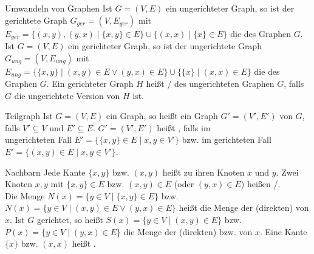 \begin{Def}{Umwandeln von Graphen}
    Ist $G = (V, E)$ ein ungerichteter Graph, so ist der gerichtete
    Graph $G_{ger} = (V, E_{ger})$ mit
    $E_{ger} = \big\{(x, y), (y, x) \;|\; \{x, y\} \in E\big\} \cup
    \big\{(x, x) \;|\; \{x\} \in E\big\}$
    die  des Graphen $G$. \\
    Ist $G = (V, E)$ ein gerichteter Graph, so ist der ungerichtete
    Graph $G_{ung} = (V, E_{ung})$ mit
    $E_{ung} = \big\{\{x, y\} \;|\; (x, y) \in E \lor (y, x) \in E\big\} \cup
    \big\{\{x\} \;|\; (x, x) \in E\big\}$
    die  des Graphen $G$. \qquad
    Ein gerichteter Graph $H$ heißt
    / des ungerichteten Graphen $G$,
    falls $G$ die ungerichtete Version von $H$ ist.
\end{Def}

\begin{Def}{Teilgraph}
    Ist $G = (V, E)$ ein Graph, so heißt ein Graph
    $G' = (V', E')$  von $G$, falls $V' \subseteq V$ und
    $E' \subseteq E$. \qquad
    $G' = (V', E')$ heißt , falls
    im \\
    ungerichteten Fall
    $E' = \big\{\{x, y\} \in E \;|\; x, y \in V'\big\}$ bzw.
    im gerichteten Fall \\
    $E' = \big\{(x, y) \in E \;|\; x, y \in V'\big\}$.
\end{Def}

\begin{Def}{Nachbarn}
    Jede Kante $\{x, y\}$ bzw. $(x, y)$ heißt  zu ihren
    Knoten $x$ und $y$.
    Zwei Knoten $x, y$ mit $\{x, y\} \in E$ bzw. $(x, y) \in E$
    (oder $(y, x) \in E$) heißen /. \\
    Die Menge $N(x) = \big\{y \in V \;|\; \{x, y\} \in E\big\}$ bzw.
    $N(x) = \big\{y \in V \;|\; (x, y) \in E \lor (y, x) \in E\big\}$
    heißt die Menge der (direkten)  von $x$.
    Ist $G$ gerichtet, so heißt
    $S(x) = \big\{y \in V \;|\; (x, y) \in E\big\}$ bzw.
    $P(x) = \big\{y \in V \;|\; (y, x) \in E\big\}$ die Menge der
    (direkten)  bzw.  von $x$.
    Eine Kante $\{x\}$ bzw. $(x, x)$ heißt .
\end{Def}

